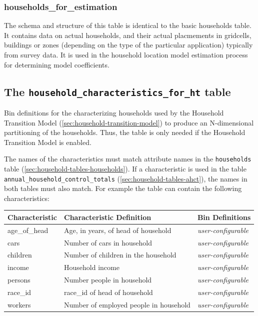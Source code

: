 \subsubsection{households_for_estimation }

The schema and structure of this table is identical to the basic households
table. It contains data on actual households, and their actual placmements in
gridcells, buildings or zones (depending on the type of the particular application) 
typically from survey data. It is used in the household
location model estimation process for determining model
coefficients.

\subsection{The {\tt household_characteristics_for_ht} table}
\label{sec:household-tables-char-for-ht}

Bin definitions for the characterizing households used by the Household
Transition Model (\ref{sec:household-transition-model})
to produce an N-dimensional partitioning of the households. Thus, the table is only needed if the
Household Transition Model is enabled.

The names of the
characteristics must match
attribute names in the {\tt households} table (\ref{sec:household-tables-households}).
If a characteristic is used in the table {\tt annual_household_control_totals}
(\ref{sec:household-tables-ahct}), the names in both tables must also match.
For example the table can contain the following
characteristics:

\begin{tabular}{lp{2in}p{3in}}
\textbf{Characteristic}
&\textbf{Characteristic Definition}
&\textbf{Bin Definitions}
\\
\hline
age_of_head & Age, in years, of head of household  & \emph{user-configurable}
\\
\hline
cars &Number of cars in household & \emph{user-configurable}
\\
\hline
children &Number of children in the household & \emph{user-configurable}
\\
\hline
income &Household income  & \emph{user-configurable}
\\
\hline
persons &Number people in household & \emph{user-configurable}
\\
\hline
race_id &race_id of head of household & \emph{user-configurable}
\\
\hline
workers &Number of employed people in household & \emph{user-configurable}
\\
\hline

\end{tabular}


